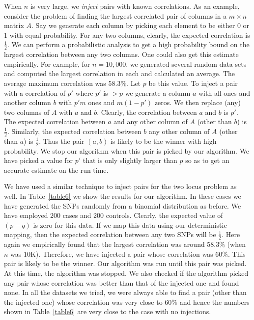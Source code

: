 \documentclass{article}
\theoremstyle{definition}
\theoremstyle{remark}
\begin{document}
When $n$ is very large, we {\em inject} pairs with known correlations. As an example, consider the problem of finding the largest correlated pair of columns in a $m\times n$ matrix $A$. Say we generate each column by picking each element to be either 0 or 1 with equal probability. For any two columns, clearly, the expected correlation is $\frac{1}{2}$. We can perform a probabilistic analysis to get a high probability bound on the largest correlation between any two columns. One could also get this estimate empirically. For example, for $n=10,000$, we generated several random data sets and computed the largest correlation in each and calculated an average. The average maximum correlation was $58.3\%$. Let $p$ be this value. To inject a pair with a correlation of $p'$ where $p'$ is $>p$ we generate a column $a$ with all ones and another column $b$ with $p'm$ ones and $m(1-p')$ zeros. We then replace (any) two columns of $A$ with $a$ and $b$. Clearly, the correlation between $a$ and $b$ is $p'$. The expected correlation between $a$ and any other column of $A$ (other than $b$) is $\frac{1}{2}$. Similarly, the expected correlation between $b$ any other column of $A$ (other than $a$) is $\frac{1}{2}$. Thus the pair $(a,b)$ is likely to be the winner with high probability. We stop our algorithm when this pair is picked by our algorithm. We have picked a value for $p'$ that is only slightly larger than $p$ so as to get an accurate estimate on the run time.

We have used a similar technique to inject pairs for the two locus problem as well. In Table~\ref{table6} we show the results for our algorithm. In these cases we have generated the SNPs randomly from a binomial distribution as before. We have employed 200 cases and 200 controls. Clearly, the expected value of $(p-q)$ is zero for this data. If we map this data using our deterministic mapping, then the expected correlation between any two SNPs will be $\frac{1}{2}$. Here again we empirically found that the largest correlation was around 58.3\% (when $n$ was $10$K). Therefore, we  have injected a pair whose correlation was $60$\%. This pair is likely to be the winner. Our algorithm was run until this pair was picked. At this time, the algorithm was stopped. We also checked if the algorithm picked any pair whose correlation was better than that of the injected one and found none. In all the datasets we tried, we were always able to find a pair (other than the injected one) whose correlation was very close to 60\% and hence the numbers shown in Table~\ref{table6} are very close to the case with no injections.
\end{document}

